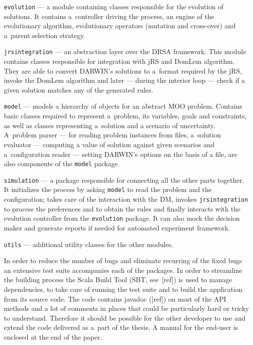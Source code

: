 \begin{description}
  \item{\texttt{evolution}} --- a module containing classes responsible for
    the evolution of solutions. It contains a~controller driving the process,
    an engine of the evolutionary algorithm, evolutionary operators (mutation
    and cross-over) and a~parent selection strategy.

  \item{\texttt{jrsintegration}} --- an abstraction layer over the DRSA
    framework. This module contains classes responsible for integration with
    jRS and DomLem algorithm. They are able to convert DARWIN's solutions to
    a~format required by the jRS, invoke the DomLem algorithm and later ---
    during the interior loop --- check if a given solution matches any of the
    generated rules.

  \item{\texttt{model}} --- models a hierarchy of objects for an abstract MOO
    problem. Contains basic classes required to represent a~problem, its
    variables, goals and constraints, as well as classes representing
    a~solution and a scenario of uncertainty. A~problem parser --- for reading
    problem instances from files, a~solution evaluator --- computing a value
    of solution against given scenarios and a~configuration reader --- setting
    DARWIN's options on the basis of a file, are also components of the
    \texttt{model} package.
  \item{\texttt{simulation}} --- a package responsible for connecting all the
    other parts together. It initializes the process by asking \texttt{model}
    to read the problem and the configuration; takes care of the interaction
    with the DM, invokes \texttt{jrsintegration} to process the preferences
    and to obtain the rules and finally interacts with the evolution
    controller from the \texttt{evolution} package. It can also mock the
    decision maker and generate reports if needed for automated experiment
    framework.

  \item{\texttt{utils}} --- additional utility classes for the other modules.
\end{description}

In order to reduce the number of bugs and eliminate recurring of the fixed
bugs an extensive test suite accompanies each of the packages. In order to
streamline the building process the Scala Build Tool (SBT, see~[ref]) is used
to manage dependencies, to take care of running the test suite and to build
the application from its source code. The code contains javadoc ([ref]) on
most of the API methods and a lot of comments in places that could be
particularly hard or tricky to understand. Therefore it should be possible for
the other developer to use and extend the code delivered as a~part of the
thesis. A manual for the end-user is enclosed at the end of the paper.

